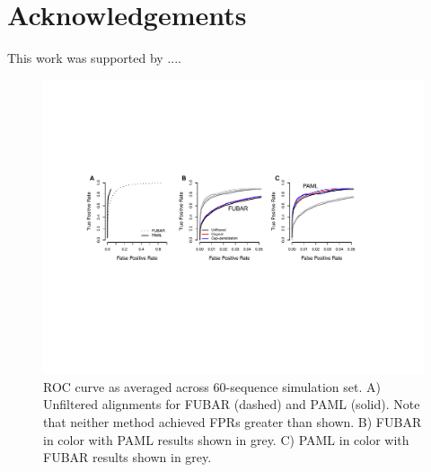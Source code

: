 \documentclass[11pt]{article}
\begin{document}
\section{Acknowledgements}
This work was supported by ....


\begin{figure}[H]
\centerline{\includegraphics[width=6.75in]{Figures/roc.pdf}}
\caption{\label{roc} ROC curve as averaged across 60-sequence simulation set. A) Unfiltered alignments for FUBAR (dashed) and PAML (solid). Note that neither method achieved FPRs greater than shown. B) FUBAR in color with PAML results shown in grey. C) PAML in color with FUBAR results shown in grey.}
\end{figure}

\bigskip
\end{document}
